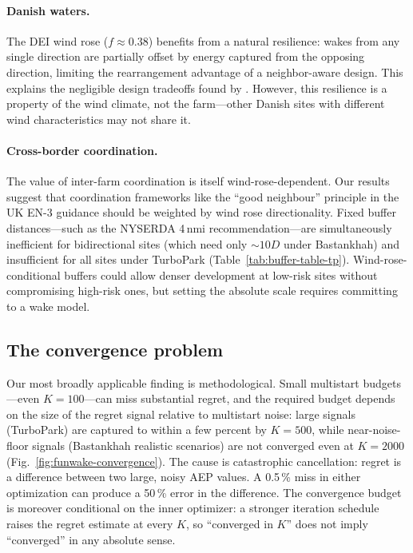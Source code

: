 \documentclass[wes, manuscript]{copernicus}
\begin{document}
\paragraph{Danish waters.}
The DEI wind rose ($f \approx 0.38$) benefits from a natural resilience: wakes from any single direction are partially offset by energy captured from the opposing direction, limiting the rearrangement advantage of a neighbor-aware design.
This explains the negligible design tradeoffs found by \citet{Quick2026omae}.
However, this resilience is a property of the wind climate, not the farm---other Danish sites with different wind characteristics may not share it.

\paragraph{Cross-border coordination.}
The value of inter-farm coordination is itself wind-rose-dependent.
Our results suggest that coordination frameworks like the ``good neighbour'' principle in the UK EN-3 guidance should be weighted by wind rose directionality.
Fixed buffer distances---such as the NYSERDA 4\,nmi recommendation---are simultaneously inefficient for bidirectional sites (which need only $\sim$$10D$ under Bastankhah) and insufficient for all sites under TurboPark (Table~\ref{tab:buffer-table-tp}).
Wind-rose-conditional buffers could allow denser development at low-risk sites without compromising high-risk ones, but setting the absolute scale requires committing to a wake model.

\subsection{The convergence problem}

Our most broadly applicable finding is methodological.
Small multistart budgets---even $K = 100$---can miss substantial regret, and the required budget depends on the size of the regret signal relative to multistart noise: large signals (TurboPark) are captured to within a few percent by $K = 500$, while near-noise-floor signals (Bastankhah realistic scenarios) are not converged even at $K = 2000$ (Fig.~\ref{fig:funwake-convergence}).
The cause is catastrophic cancellation: regret is a difference between two large, noisy AEP values.
A 0.5\,\% miss in either optimization can produce a 50\,\% error in the difference.
The convergence budget is moreover conditional on the inner optimizer: a stronger iteration schedule raises the regret estimate at every $K$, so ``converged in $K$'' does not imply ``converged'' in any absolute sense.
\end{document}
